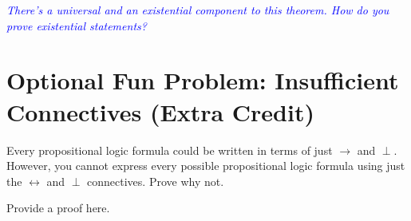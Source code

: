 \documentclass{article}
\renewcommand{\(}{\left(}
\renewcommand{\)}{\right)}
\theoremstyle{plain}
\theoremstyle{plain}
\theoremstyle{definition}
\newcommand{\annotate}[1]{\textit{\textcolor{blue}{#1}}}
\begin{document}
\annotate{There's a universal and an existential component to this theorem. How do you prove existential statements?}

\section*{Optional Fun Problem: Insufficient Connectives
(Extra Credit)}

Every propositional logic formula could be written in terms of just $\rightarrow$ and $\perp$. However, you cannot express every possible propositional logic formula using just the $\leftrightarrow$ and $\perp$ connectives. Prove why not.

\begin{shaded}
Provide a proof here.
\end{shaded}
\end{document}
